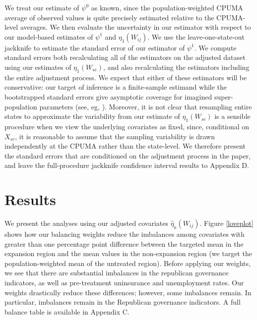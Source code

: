 \documentclass[12pt]{article}
\begin{document}
We treat our estimate of $\psi^0$ as known, since the population-weighted CPUMA average of observed values is quite precisely estimated relative to the CPUMA-level averages. We then evaluate the uncertainty in our estimator with respect to our model-based estimates of $\psi^1$ and $\eta_1(W_{ij})$. We use the leave-one-state-out jackknife to estimate the standard error of our estimator of $\psi^1$. We compute standard errors both recalculating all of the estimators on the adjusted dataset using our estimates of $\eta_1(W_{sc})$, and also recalculating the estimators including the entire adjustment process. We expect that either of these estimators will be conservative: our target of inference is a finite-sample estimand while the bootstrapped standard errors give asymptotic coverage for imagined super-population parameters (see, eg, \cite{imbens2015causal}). Moreover, it is not clear that resampling entire states to approximate the variability from our estimate of $\eta_1(W_{sc})$ is a sensible procedure when we view the underlying covariates as fixed, since, conditional on $X_{sc}$, it is reasonable to assume that the sampling variability is drawn independently at the CPUMA rather than the state-level. We therefore present the standard errors that are conditioned on the adjustment process in the paper, and leave the full-procedure jackknife confidence interval results to Appendix D. 

\section{Results}

We present the analyses using our adjusted covariates $\hat{\eta}_a(W_{ij})$. Figure \ref{loveplot} shows how our balancing weights reduce the imbalances among covariates with greater than one percentage point difference between the targeted mean in the expansion region and the mean values in the non-expansion region (we target the population-weighted mean of the untreated region). Before applying our weights, we see that there are substantial imbalances in the republican governance indicators, as well as pre-treatment uninsurance and unemployment rates. Our weights drastically reduce these differences; however, some imbalances remain. In particular, imbalances remain in the Republican governance indicators. A full balance table is available in Appendix C. 
\end{document}
